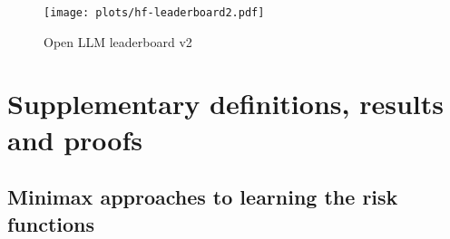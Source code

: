 
\begin{figure}[H]
    \centering
    \texttt{[image: plots/hf-leaderboard2.pdf]}
    \caption{Open LLM leaderboard v2}
    \label{fig:rexp_open_llm2}
\end{figure}



\section{Supplementary definitions, results and proofs}
\label{sec:proofs}


\subsection{Minimax approaches to learning the risk functions}
\label{sec:reg-fn-estimate}

